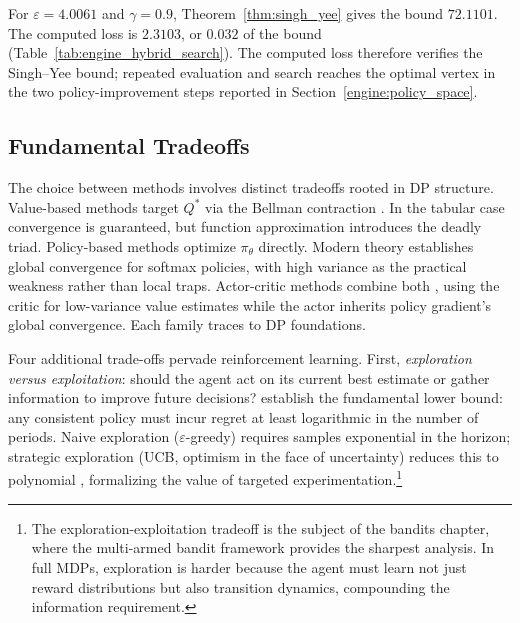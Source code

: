 For $\varepsilon=4.0061$ and $\gamma=0.9$, Theorem~\ref{thm:singh_yee} gives the bound $72.1101$. The computed loss is $2.3103$, or $0.032$ of the bound (Table~\ref{tab:engine_hybrid_search}). The computed loss therefore verifies the Singh--Yee bound; repeated evaluation and search reaches the optimal vertex in the two policy-improvement steps reported in Section~\ref{engine:policy_space}.

\FloatBarrier
\subsection{Fundamental Tradeoffs}
\label{sec:tradeoffs}

The choice between methods involves distinct tradeoffs rooted in DP structure. Value-based methods target $Q^*$ via the Bellman contraction \citep{szepesvari2010}. In the tabular case convergence is guaranteed, but function approximation introduces the deadly triad. Policy-based methods optimize $\pi_\theta$ directly. Modern theory \citep{agarwal2021theory} establishes global convergence for softmax policies, with high variance as the practical weakness rather than local traps. Actor-critic methods combine both \citep{konda2000}, using the critic for low-variance value estimates while the actor inherits policy gradient's global convergence. Each family traces to DP foundations.

Four additional trade-offs pervade reinforcement learning. First, \emph{exploration versus exploitation}: should the agent act on its current best estimate or gather information to improve future decisions? \citet{LaiRobbins1985} establish the fundamental lower bound: any consistent policy must incur regret at least logarithmic in the number of periods. Naive exploration ($\varepsilon$-greedy) requires samples exponential in the horizon; strategic exploration (UCB, optimism in the face of uncertainty) reduces this to polynomial \citep{auer2002}, formalizing the value of targeted experimentation.\footnote{The exploration-exploitation tradeoff is the subject of the bandits chapter, where the multi-armed bandit framework provides the sharpest analysis. In full MDPs, exploration is harder because the agent must learn not just reward distributions but also transition dynamics, compounding the information requirement.}

